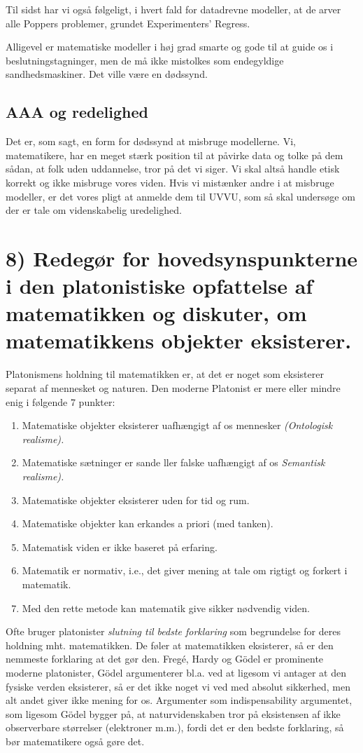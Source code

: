 \documentclass[a4paper,oneside,12pt]{memoir}
\begin{document}
Til sidst har vi også følgeligt, i hvert fald for datadrevne modeller, at de arver alle Poppers problemer, grundet Experimenters' Regress.

Alligevel er matematiske modeller i høj grad smarte og gode til at guide os i beslutningstagninger, men de må ikke mistolkes som endegyldige sandhedsmaskiner. Det ville være en dødssynd.

\subsection{AAA og redelighed}
Det er, som sagt, en form for dødssynd at misbruge modellerne. Vi, matematikere, har en meget stærk position til at påvirke data og tolke på dem sådan, at folk uden uddannelse, tror på det vi siger. Vi skal altså handle etisk korrekt og ikke misbruge vores viden. Hvis vi mistænker andre i at misbruge modeller, er det vores pligt at anmelde dem til UVVU, som så skal undersøge om der er tale om videnskabelig uredelighed.

\newpage
\section{8) Redegør for hovedsynspunkterne i den platonistiske opfattelse af matematikken og diskuter, om matematikkens objekter eksisterer.}
Platonismens holdning til matematikken er, at det er noget som eksisterer separat af mennesket og naturen. Den moderne Platonist er mere eller mindre enig i følgende 7 punkter:
\begin{enumerate}
\item Matematiske objekter eksisterer uafhængigt af os mennesker \textit{(Ontologisk realisme).}
\item Matematiske sætninger er sande ller falske uafhængigt af os \textit{Semantisk realisme).}
\item Matematiske objekter eksisterer uden for tid og rum.
\item Matematiske objekter kan erkandes a priori (med tanken).
\item Matematisk viden er ikke baseret på erfaring.
\item Matematik er normativ, i.e., det giver mening at tale om rigtigt og forkert i matematik.
\item Med den rette metode kan matematik give sikker nødvendig viden.
\end{enumerate}
Ofte bruger platonister \textit{slutning til bedste forklaring} som begrundelse for deres holdning mht. matematikken. De føler at matematikken eksisterer, så er den nemmeste forklaring at det gør den. Fregé, Hardy og Gödel er prominente moderne platonister, Gödel argumenterer bl.a. ved at ligesom vi antager at den fysiske verden eksisterer, så er det ikke noget vi ved med absolut sikkerhed, men alt andet giver ikke mening for os. Argumenter som indispensability argumentet, som ligesom Gödel bygger på, at naturvidenskaben tror på eksistensen af ikke observerbare størrelser (elektroner m.m.), fordi det er den bedste forklaring, så bør matematikere også gøre det.
\end{document}
